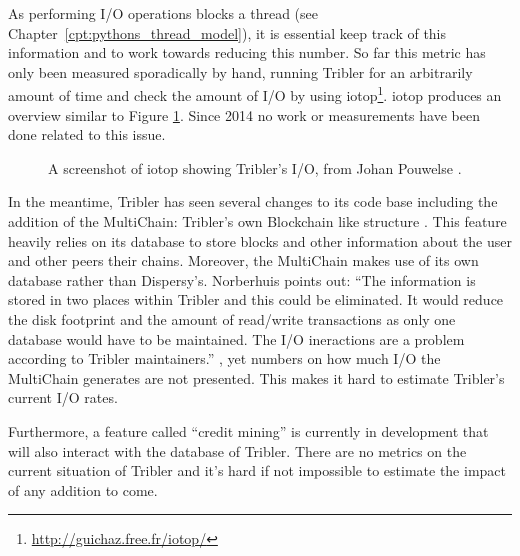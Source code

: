 As performing I/O operations blocks a thread (see Chapter~\ref{cpt:pythons_thread_model}), it is essential keep track of this information and to work towards reducing this number.
So far this metric has only been measured sporadically by hand, running Tribler for an arbitrarily amount of time and check the amount of I/O by using iotop\footnote{\url{http://guichaz.free.fr/iotop/}}.
iotop produces an overview similar to Figure \ref{fig:iotop_tribler_april_2014}.
Since 2014 no work or measurements have been done related to this issue.

\begin{figure}[h]
	\caption{A screenshot of iotop showing Tribler's I/O, from Johan Pouwelse \cite{pouwelse2014reduce}.}
	\label{fig:iotop_tribler_april_2014}
\end{figure}

In the meantime, Tribler has seen several changes to its code base including the addition of the MultiChain: Tribler's own Blockchain like structure \cite{norberhuis2015multichain}.
This feature heavily relies on its database to store blocks and other information about the user and other peers their chains.
Moreover, the MultiChain makes use of its own database rather than Dispersy's.
Norberhuis points out: ``The information is stored in two places within Tribler and this could be eliminated. It would reduce the disk footprint and the amount of read/write transactions as only one database would have to be maintained. The I/O ineractions are a problem according to Tribler maintainers.'' \cite{norberhuis2015multichain}, yet numbers on how much I/O the MultiChain generates are not presented.
This makes it hard to estimate Tribler's current I/O rates.

Furthermore, a feature called ``credit mining'' is currently in development that will also interact with the database of Tribler.
There are no metrics on the current situation of Tribler and it's hard if not impossible to estimate the impact of any addition to come.

